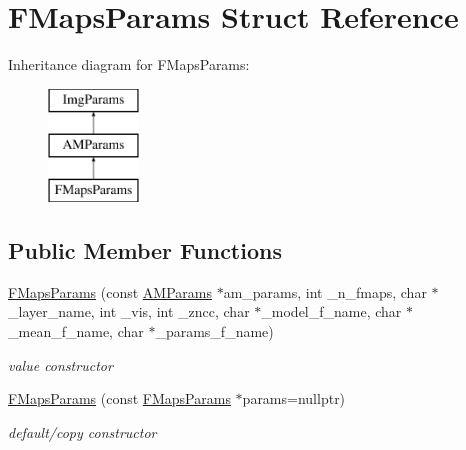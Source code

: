 \hypertarget{structFMapsParams}{\section{F\-Maps\-Params Struct Reference}
\label{structFMapsParams}
}
Inheritance diagram for F\-Maps\-Params\-:\begin{figure}[H]
\begin{center}
\leavevmode
\includegraphics[height=3.000000cm]{structFMapsParams}
\end{center}
\end{figure}
\subsection*{Public Member Functions}
\begin{DoxyCompactItemize}
\item 
\hypertarget{structFMapsParams_a0b84c8b27120148ff0525d777f2c5773}{\hyperlink{structFMapsParams_a0b84c8b27120148ff0525d777f2c5773}{F\-Maps\-Params} (const \hyperlink{structAMParams}{A\-M\-Params} $\ast$am\-\_\-params, int \-\_\-n\-\_\-fmaps, char $\ast$\-\_\-layer\-\_\-name, int \-\_\-vis, int \-\_\-zncc, char $\ast$\-\_\-model\-\_\-f\-\_\-name, char $\ast$\-\_\-mean\-\_\-f\-\_\-name, char $\ast$\-\_\-params\-\_\-f\-\_\-name)}\label{structFMapsParams_a0b84c8b27120148ff0525d777f2c5773}

\begin{DoxyCompactList}\small\item\em value constructor \end{DoxyCompactList}\item 
\hypertarget{structFMapsParams_a28043c4e323a356f7865366c532b0677}{\hyperlink{structFMapsParams_a28043c4e323a356f7865366c532b0677}{F\-Maps\-Params} (const \hyperlink{structFMapsParams}{F\-Maps\-Params} $\ast$params=nullptr)}\label{structFMapsParams_a28043c4e323a356f7865366c532b0677}

\begin{DoxyCompactList}\small\item\em default/copy constructor \end{DoxyCompactList}\end{DoxyCompactItemize}
